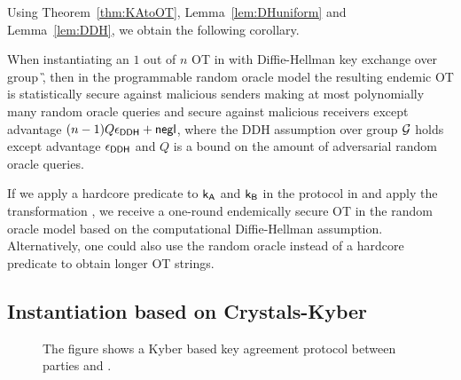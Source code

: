 Using Theorem~\ref{thm:KAtoOT}, Lemma~\ref{lem:DHuniform} and Lemma~\ref{lem:DDH}, we obtain the following corollary.

\begin{corollary}
When instantiating an $1$ out of $n$ OT in  with Diffie-Hellman key exchange over group \G, then in the programmable random oracle model the resulting endemic OT is statistically secure against malicious senders making at most polynomially many random oracle queries and secure against malicious receivers except advantage $(n-1)Q\epsilon_{\mathsf{DDH}}+\mathsf{negl}$, where the DDH assumption over group $\mathcal{G}$ holds except advantage $\epsilon_{\mathsf{DDH}}$ and $Q$ is a bound on the amount of adversarial random oracle queries.
\end{corollary}

\begin{remark}
If we apply a hardcore predicate to $\mathsf{k}_{\mathsf{A}}$ and $\mathsf{k}_{\mathsf{B}}$ in the protocol in  and apply the transformation , we receive a one-round endemically secure OT in the random oracle model based on the computational Diffie-Hellman assumption. Alternatively, one could also use the random oracle instead of a hardcore predicate to obtain longer OT strings. 
\end{remark}

\subsection{Instantiation based on Crystals-Kyber}
 

\begin{figure}[h!]
\centering
{}
\label{fig:Kyber}
\caption{The figure shows a Kyber based key agreement protocol between parties \A and \B.}
\end{figure}

